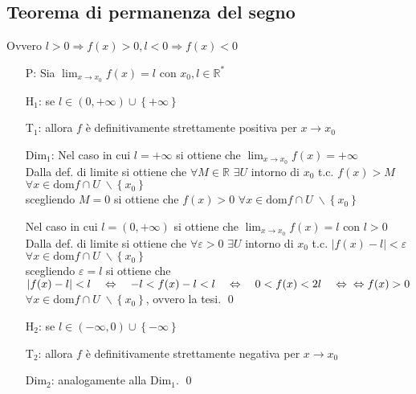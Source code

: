 \documentclass[a4paper]{article}
\newcommand\dom{\text{dom}}
\begin{document}
\subsection{Teorema di permanenza del segno}
Ovvero \(l > 0 \Rightarrow f(x) > 0, l < 0 \Rightarrow f(x) < 0\)
\begin{itemize}
	\item[P:] Sia \(\displaystyle \lim_{x \to x_0} f(x) = l\) con \(x_0, l \in \mathbb{R}^*\)
	\item[H\(_1\):] se \(l \in \left( 0, + \infty \right) \cup \left\{+ \infty\right\}\)
	\item[T\(_1\):] allora \(f\) è definitivamente strettamente positiva per \(x \to x_0\)
	\item[Dim\(_1\):] Nel caso in cui \(l = + \infty\) si ottiene che \(\displaystyle \lim_{x \to x_0} f(x) = + \infty\) \\
	Dalla def. di limite si ottiene che \(\forall M \in \mathbb{R}\) \(\exists U\) intorno di \(x_0\) t.c. \(f(x) > M\) \(\forall x \in \dom f \cap U \; \backslash \left\{ x_0 \right\}\) \\
	scegliendo \(M = 0\) si ottiene che \(f(x) > 0\) \(\forall x \in \dom f \cap U \; \backslash \left\{ x_0 \right\}\)
	\item[] Nel caso in cui \(l = \left( 0, + \infty \right)\) si ottiene che \(\displaystyle \lim_{x \to x_0} f(x) = l\) con \(l > 0\) \\
	Dalla def. di limite si ottiene che \(\forall \varepsilon > 0\) \(\exists U\) intorno di \(x_0\) t.c. \(\left| f(x) - l \right| < \varepsilon\) \(\forall x \in \dom f \cap U \; \backslash \left\{ x_0 \right\}\) \\
	scegliendo \(\varepsilon = l\) si ottiene che \(\left| f(x) - l \right| < l \quad \Leftrightarrow \quad -l < f(x) - l < l \quad \Leftrightarrow \quad 0 < f(x) < 2l \quad \Leftrightarrow \\
	\Leftrightarrow f(x) > 0\) \(\forall x \in \dom f \cap U \; \backslash \left\{ x_0 \right\}\), ovvero la tesi. \qed

	\item[H\(_2\):] se \(l \in \left( - \infty, 0 \right) \cup \left\{- \infty\right\}\)
	\item[T\(_2\):] allora \(f\) è definitivamente strettamente negativa per \(x \to x_0\)
	\item[Dim\(_2\):] analogamente alla Dim\(_1\). \qed
\end{itemize}
\end{document}
